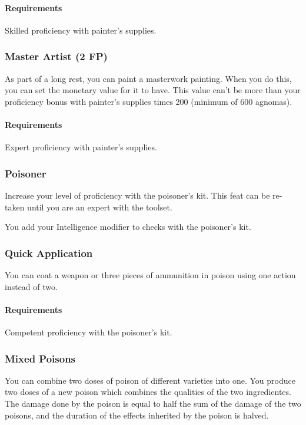     \paragraph{Requirements} Skilled proficiency with painter's supplies.
\subsubsection{Master Artist (2 FP)} \label{feat::masterartist}
    As part of a long rest, you can paint a masterwork painting.
    When you do this, you can set the monetary value for it to have.
    This value can't be more than your proficiency bonus with painter's supplies times 200 (minimum of 600 agnomas).
    \paragraph{Requirements} Expert proficiency with painter's supplies.

\subsubsection{Poisoner} \label{feat::poisoner}
    Increase your level of proficiency with the poisoner's kit.
    This feat can be re-taken until you are an expert with the toolset.

    You add your Intelligence modifier to checks with the poisoner's kit.
\subsubsection{Quick Application} \label{feat::quickapplication}
    You can coat a weapon or three pieces of ammunition in poison using one action instead of two.
    \paragraph{Requirements} Competent proficiency with the poisoner's kit.
\subsubsection{Mixed Poisons} \label{feat::mixedpoisons}
    You can combine two doses of poison of different varieties into one.
    You produce two doses of a new poison which combines the qualities of the two ingredientes.
    The damage done by the poison is equal to half the sum of the damage of the two poisons, and the duration of the effects inherited by the poison is halved.
